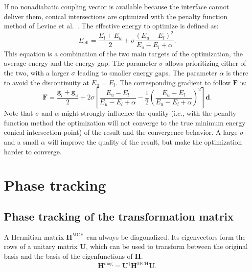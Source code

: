 \documentclass[a4paper,10pt,DIV=15,openany]{scrbook}
\newcommand{\VEC}[1]{\ensuremath{\mathbf{#1}}}
\begin{document}
If no nonadiabatic coupling vector is available because the interface cannot deliver them, conical intersections are optimized with the penalty function method of Levine et al.~\cite{Levine2008JPCB}.
The effective energy to optimize is defined as:
\begin{equation}
  E_\text{eff}=
  \frac{E_l+E_u}{2}
  +\sigma\frac{(E_u-E_l)^2}{E_u-E_l+\alpha}.
\end{equation}
This equation is a combination of the two main targets of the optimization, the average energy and the energy gap. 
The parameter $\sigma$ allows prioritizing either of the two, with a larger $\sigma$ leading to smaller energy gaps.
The parameter $\alpha$ is there to avoid the discontinuity at $E_u=E_l$.
The corresponding gradient to follow $\VEC{F}$ is:
\begin{equation}
  \VEC{F}=
  \frac{\VEC{g}_l+\VEC{g}_u}{2}
  +
  2\sigma\left[\frac{E_u-E_l}{E_u-E_l+\alpha}-\frac{1}{2}\left(\frac{E_u-E_l}{E_u-E_l+\alpha}\right)^2\right]\VEC{d}.
\end{equation}
Note that $\sigma$ and $\alpha$ might strongly influence the quality (i.e., with the penalty function method the optimization will not converge to the true minimum energy conical intersection point) of the result and the convergence behavior.
A large $\sigma$ and a small $\alpha$ will improve the quality of the result, but make the optimization harder to converge.



\section{Phase tracking}

\subsection{Phase tracking of the transformation matrix}\label{met:phase_track}

A Hermitian matrix $\VEC{H}^{\text{MCH}}$ can always be diagonalized. Its eigenvectors form the rows of a unitary matrix $\VEC{U}$, which can be used to transform between the original basis and the basis of the eigenfunctions of $\VEC{H}$. 
\begin{equation}
  \VEC{H}^{\text{diag}}=\VEC{U}^\dagger\VEC{H}^{\text{MCH}}\VEC{U}.
\end{equation}
\end{document}
